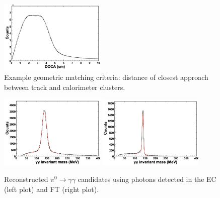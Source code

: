 \begin{figure}
\centering
\includegraphics[width=0.45\textwidth,height=0.2\textheight]{pics/pcal-doca.png}
\caption{Example geometric matching criteria:  distance of closest approach between track and calorimeter clusters.\label{fig:ebmatch}}
\end{figure}

\begin{figure}
\centering
\includegraphics[width=0.45\textwidth]{pics/ecal_pi0.png}
\includegraphics[width=0.45\textwidth]{pics/ft_pi0.png}
\caption{Reconstructed $\pi^{0}\rightarrow \gamma \gamma$ candidates using photons detected in the EC (left plot) and FT (right plot).}
\label{fig:pi0mass}
\end{figure}


